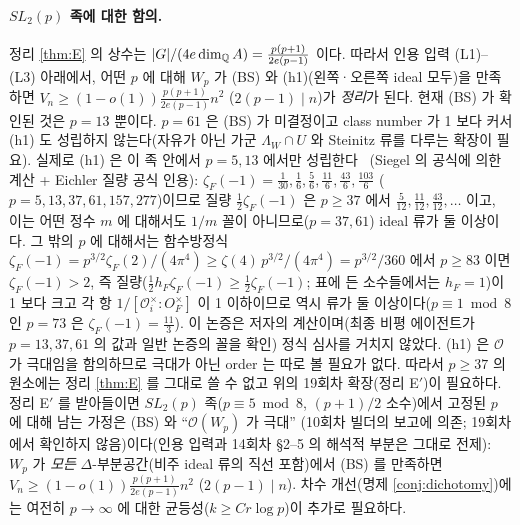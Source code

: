 \paragraph{$SL_2(p)$ 족에 대한 함의.} 정리 \ref{thm:E} 의 상수는 $|G|/(4e\dim_{\mathbb{Q}} A)=\tfrac{p(p+1)}{2e(p-1)}$ 이다. 따라서 인용 입력 (L1)--(L3) 아래에서, 어떤 $p$ 에 대해 $W_p$ 가 (BS) 와 (h1)(왼쪽·오른쪽 ideal 모두)을 만족하면 $V_n\ge(1-o(1))\tfrac{p(p+1)}{2e(p-1)}n^2$ ($2(p-1)\mid n$)가 \emph{정리}가 된다. 현재 (BS) 가 확인된 것은 $p=13$ 뿐이다. $p=61$ 은 (BS) 가 미결정이고 class number 가 1 보다 커서 (h1) 도 성립하지 않는다(자유가 아닌 가군 $\Lambda_W\cap U$ 와 Steinitz 류를 다루는 확장이 필요). 실제로 (h1) 은 이 족 안에서 $p=5,13$ 에서만 성립한다 \tagPC\ (Siegel 의 공식에 의한 계산 + Eichler 질량 공식 인용): $\zeta_F(-1)=\tfrac1{30},\tfrac16,\tfrac56,\tfrac{11}6,\tfrac{43}6,\tfrac{103}6$ ($p=5,13,37,61,157,277$)이므로 질량 $\tfrac12\zeta_F(-1)$ 은 $p\ge37$ 에서 $\tfrac5{12},\tfrac{11}{12},\tfrac{43}{12},\dots$ 이고, 이는 어떤 정수 $m$ 에 대해서도 $1/m$ 꼴이 아니므로($p=37,61$) ideal 류가 둘 이상이다. 그 밖의 $p$ 에 대해서는 함수방정식 $\zeta_F(-1)=p^{3/2}\zeta_F(2)/(4\pi^4)\ge\zeta(4)\,p^{3/2}/(4\pi^4)=p^{3/2}/360$ 에서 $p\ge83$ 이면 $\zeta_F(-1)>2$, 즉 질량($\tfrac12h_F\zeta_F(-1)\ge\tfrac12\zeta_F(-1)$; 표에 든 소수들에서는 $h_F=1$)이 1 보다 크고 각 항 $1/[\mathcal O_i^\times:O_F^\times]$ 이 1 이하이므로 역시 류가 둘 이상이다($p\equiv1\bmod8$ 인 $p=73$ 은 $\zeta_F(-1)=\tfrac{11}3$). 이 논증은 저자의 계산이며(최종 비평 에이전트가 $p=13,37,61$ 의 값과 일반 논증의 꼴을 확인) 정식 심사를 거치지 않았다. (h1) 은 $\mathcal O$ 가 극대임을 함의하므로 극대가 아닌 order 는 따로 볼 필요가 없다. 따라서 $p\ge37$ 의 원소에는 정리 \ref{thm:E} 를 그대로 쓸 수 없고 위의 19회차 확장(정리 E$'$)이 필요하다. 정리 E$'$ 를 받아들이면 $SL_2(p)$ 족($p\equiv5\bmod8$, $(p+1)/2$ 소수)에서 고정된 $p$ 에 대해 남는 가정은 (BS) 와 ``$\mathcal O(W_p)$ 가 극대'' (10회차 빌더의 보고에 의존; 19회차에서 확인하지 않음)이다(인용 입력과 14회차 \S2--5 의 해석적 부분은 그대로 전제): $W_p$ 가 \emph{모든} $\Delta$-부분공간(비주 ideal 류의 직선 포함)에서 (BS) 를 만족하면 $V_n\ge(1-o(1))\tfrac{p(p+1)}{2e(p-1)}n^2$ ($2(p-1)\mid n$). 차수 개선(명제 \ref{conj:dichotomy})에는 여전히 $p\to\infty$ 에 대한 균등성($k\ge Cr\log p$)이 추가로 필요하다.


